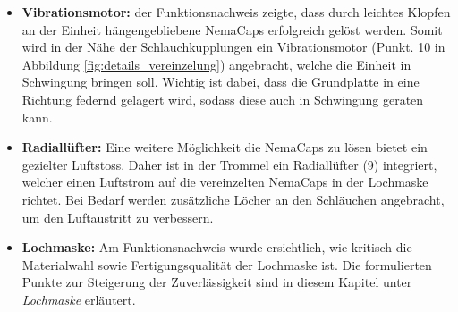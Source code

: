 \begin{itemize}
	\item \textbf{Vibrationsmotor:} der Funktionsnachweis zeigte, dass durch leichtes Klopfen an der Einheit hängengebliebene NemaCaps erfolgreich gelöst werden. Somit wird in der Nähe der Schlauchkupplungen ein Vibrationsmotor (Punkt. 10 in Abbildung \ref{fig:details_vereinzelung}) angebracht, welche die Einheit in Schwingung bringen soll. Wichtig ist dabei, dass die Grundplatte in eine Richtung federnd gelagert wird, sodass diese auch in Schwingung geraten kann.
	
	\item \textbf{Radiallüfter:} Eine weitere Möglichkeit die NemaCaps zu lösen bietet ein gezielter Luftstoss. Daher ist in der Trommel ein Radiallüfter (9) integriert, welcher einen Luftstrom auf die vereinzelten NemaCaps in der Lochmaske richtet. Bei Bedarf werden zusätzliche Löcher an den Schläuchen angebracht, um den Luftaustritt zu verbessern. 
	
	\item \textbf{Lochmaske:} Am Funktionsnachweis wurde ersichtlich, wie kritisch die Materialwahl sowie Fertigungsqualität der Lochmaske ist. Die formulierten Punkte zur Steigerung der Zuverlässigkeit sind in diesem Kapitel unter \textit{Lochmaske} erläutert.
\end{itemize}

